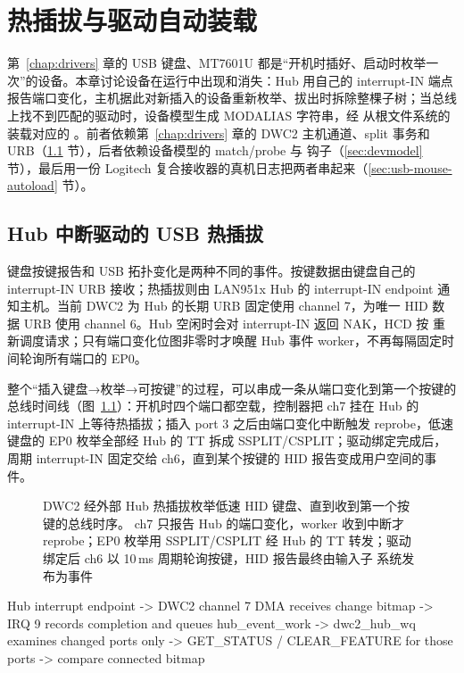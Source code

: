 \chapter{热插拔与驱动自动装载}
\label{chap:hotplug}

第~\ref{chap:drivers} 章的 USB 键盘、MT7601U 都是“开机时插好、启动时枚举一次”的设备。本章讨论设备在运行中出现和消失：Hub 用自己的 interrupt-IN 端点报告端口变化，主机据此对新插入的设备重新枚举、拔出时拆除整棵子树；当总线上找不到匹配的驱动时，设备模型生成 MODALIAS 字符串，经  从根文件系统的  装载对应的 。前者依赖第~\ref{chap:drivers} 章的 DWC2 主机通道、split 事务和 URB（\ref{sec:usb-hotplug} 节），后者依赖设备模型的 match/probe 与  钩子（\ref{sec:devmodel} 节），最后用一份 Logitech 复合接收器的真机日志把两者串起来（\ref{sec:usb-mouse-autoload} 节）。

\section{Hub 中断驱动的 USB 热插拔}
\label{sec:usb-hotplug}

键盘按键报告和 USB 拓扑变化是两种不同的事件。按键数据由键盘自己的
interrupt-IN URB 接收；热插拔则由 LAN951x Hub 的 interrupt-IN endpoint
通知主机。当前 DWC2 为 Hub 的长期 URB 固定使用 channel 7，为唯一 HID
数据 URB 使用 channel 6。Hub 空闲时会对 interrupt-IN 返回 NAK，HCD 按
 重新调度请求；只有端口变化位图非零时才唤醒 Hub 事件
worker，不再每隔固定时间轮询所有端口的 EP0。

整个“插入键盘→枚举→可按键”的过程，可以串成一条从端口变化到第一个按键的总线时间线（图~\ref{fig:usb-hid-enum-sequence}）：开机时四个端口都空载，控制器把 ch7 挂在 Hub 的 interrupt-IN 上等待热插拔；插入 port 3 之后由端口变化中断触发 reprobe，低速键盘的 EP0 枚举全部经 Hub 的 TT 拆成 SSPLIT/CSPLIT；驱动绑定完成后，周期 interrupt-IN 固定交给 ch6，直到某个按键的 HID 报告变成用户空间的事件。

\begin{figure}[p]
  \centering
  \resizebox{\linewidth}{!}{%
  
  }
  \caption{DWC2 经外部 Hub 热插拔枚举低速 HID 键盘、直到收到第一个按键的总线时序。
  ch7 只报告 Hub 的端口变化，worker 收到中断才 reprobe；EP0 枚举用 SSPLIT/CSPLIT
  经 Hub 的 TT 转发；驱动绑定后 ch6 以 10\,ms 周期轮询按键，HID 报告最终由输入子
  系统发布为事件}
  \label{fig:usb-hid-enum-sequence}
\end{figure}

\begin{txtcode}
Hub interrupt endpoint
  -> DWC2 channel 7 DMA receives change bitmap
  -> IRQ 9 records completion and queues hub_event_work
  -> dwc2_hub_wq examines changed ports only
  -> GET_STATUS / CLEAR_FEATURE for those ports
  -> compare connected bitmap
\end{txtcode}

